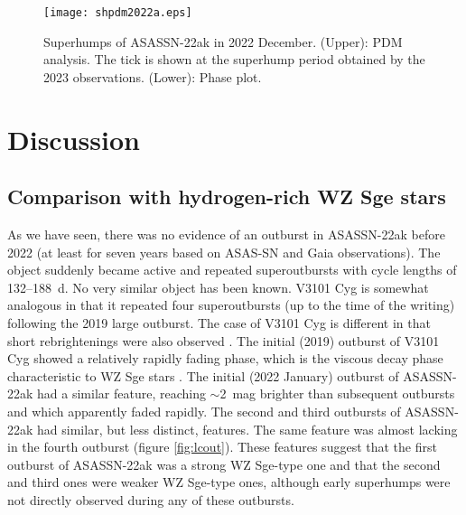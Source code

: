 \documentclass{article}
\begin{document}
\begin{figure*}
\begin{center}
\texttt{[image: shpdm2022a.eps]}
\caption{
   Superhumps of ASASSN-22ak in 2022 December.
   (Upper): PDM analysis.  The tick is shown at the superhump
   period obtained by the 2023 observations.
   (Lower): Phase plot.
}
\label{fig:shpdm2022a}
\end{center}
\end{figure*}

\section{Discussion}

\subsection{Comparison with hydrogen-rich WZ Sge stars}

   As we have seen, there was no evidence of an outburst
in ASASSN-22ak before 2022 (at least for seven years based on
ASAS-SN and Gaia observations).  The object suddenly became
active and repeated superoutbursts with cycle lengths of
132--188~d.  No very similar object has been known.  V3101 Cyg
is somewhat analogous in that it repeated four superoutbursts
(up to the time of the writing) following the 2019 large
outburst.  The case of V3101 Cyg is different in that short
rebrightenings were also observed \citep{tam20v3101cyg}.
The initial (2019) outburst of V3101 Cyg showed a relatively
rapidly fading phase, which is the viscous decay phase
characteristic to WZ Sge stars \citep{kat15wzsge}.
The initial (2022 January) outburst of ASASSN-22ak had
a similar feature, reaching $\sim$2~mag brighter than
subsequent outbursts and which apparently faded rapidly.
The second and third outbursts of ASASSN-22ak had similar,
but less distinct, features.  The same feature was almost
lacking in the fourth outburst (figure \ref{fig:lcout}).
These features suggest that the first outburst of ASASSN-22ak
was a strong WZ Sge-type one and that the second and third
ones were weaker WZ Sge-type ones,
although early superhumps \citep{kat15wzsge} were not
directly observed during any of these outbursts.
\end{document}
